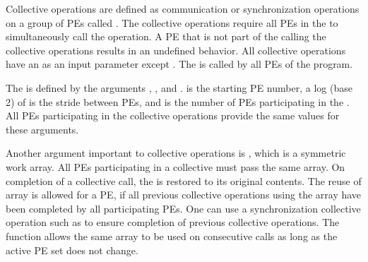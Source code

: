 
Collective operations are defined as communication or synchronization operations 
on a group of \ac{PE}s called \activeset{}. The collective operations require all
\ac{PE}s in the \activeset{} to simultaneously call the operation. 
A \ac{PE} that is not part of the \activeset{} calling the collective 
operations results in an undefined behavior.  All
collective operations have an \activeset{} as an input parameter except \barrierall{}. The \barrierall{} is called by all \ac{PE}s of the \openshmem{} program. 

The \activeset{} is defined by the arguments , , 
and .   is the starting \ac{PE} number, a log (base 2) of  is the stride between \ac{PE}s, and  is the number of \ac{PE}s participating in the \activeset{}.  All \ac{PE}s participating in the 
collective operations provide the same values for these arguments. 
 
Another argument important to collective operations is , which is a symmetric work array.  All \ac{PE}s participating in a collective must pass the same
 array.  On completion of a collective call, the  is restored to its 
original contents.  The reuse of  array is allowed for a \ac{PE}, if all previous collective operations using the  array have been completed by all participating 
\ac{PE}s.  One can use a synchronization collective operation such as \barrier{}
to ensure completion of previous collective operations. The  function allows the same  array to be used on consecutive calls as long as the active \ac{PE} set does not change. 

%


